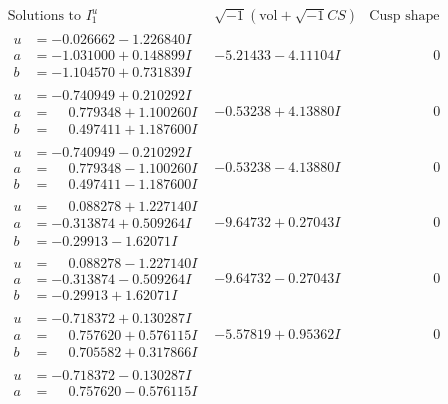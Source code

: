 \documentclass[1p]{elsarticle_modified}
\theoremstyle{definition}
\newcommand{\I}{\sqrt{-1}}
\begin{document}
$$\begin{array}{c|c|c}
\text{Solutions to }I^u_{1}& \I (\text{vol} + \sqrt{-1}CS) & \text{Cusp shape}\\
 \hline 
\begin{aligned}
u &= -0.026662 - 1.226840 I \\
a &= -1.031000 + 0.148899 I \\
b &= -1.104570 + 0.731839 I\end{aligned}
 & -5.21433 - 4.11104 I & \phantom{-0.000000 } 0 \\ \hline\begin{aligned}
u &= -0.740949 + 0.210292 I \\
a &= \phantom{-}0.779348 + 1.100260 I \\
b &= \phantom{-}0.497411 + 1.187600 I\end{aligned}
 & -0.53238 + 4.13880 I & \phantom{-0.000000 } 0 \\ \hline\begin{aligned}
u &= -0.740949 - 0.210292 I \\
a &= \phantom{-}0.779348 - 1.100260 I \\
b &= \phantom{-}0.497411 - 1.187600 I\end{aligned}
 & -0.53238 - 4.13880 I & \phantom{-0.000000 } 0 \\ \hline\begin{aligned}
u &= \phantom{-}0.088278 + 1.227140 I \\
a &= -0.313874 + 0.509264 I \\
b &= -0.29913 - 1.62071 I\end{aligned}
 & -9.64732 + 0.27043 I & \phantom{-0.000000 } 0 \\ \hline\begin{aligned}
u &= \phantom{-}0.088278 - 1.227140 I \\
a &= -0.313874 - 0.509264 I \\
b &= -0.29913 + 1.62071 I\end{aligned}
 & -9.64732 - 0.27043 I & \phantom{-0.000000 } 0 \\ \hline\begin{aligned}
u &= -0.718372 + 0.130287 I \\
a &= \phantom{-}0.757620 + 0.576115 I \\
b &= \phantom{-}0.705582 + 0.317866 I\end{aligned}
 & -5.57819 + 0.95362 I & \phantom{-0.000000 } 0 \\ \hline\begin{aligned}
u &= -0.718372 - 0.130287 I \\
a &= \phantom{-}0.757620 - 0.576115 I \\

\end{aligned}
\end{array}$$
\end{document}
